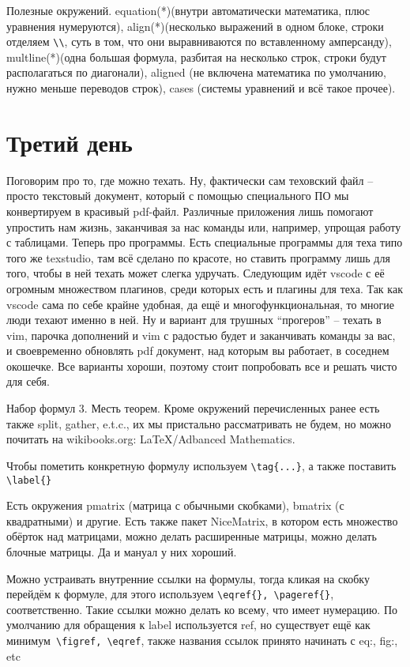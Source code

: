 \documentclass[a4paper, 12pt]{article}
\begin{document}
Полезные окружений. equation(*)(внутри автоматически математика, плюс уравнения нумеруются), align(*)(несколько выражений в одном блоке, строки отделяем \verb|\\|, суть в том, что они выравниваются по вставленному амперсанду), multline(*)(одна большая формула, разбитая на несколько строк, строки будут располагаться по диагонали), aligned (не включена математика по умолчанию, нужно меньше переводов строк), cases (системы уравнений и всё такое прочее). 

\section{Третий день}

Поговорим про то, где можно техать. Ну, фактически сам теховский файл – просто текстовый документ, который с помощью специального ПО мы конвертируем в красивый pdf-файл. Различные приложения лишь помогают упростить нам жизнь, заканчивая за нас команды или, например, упрощая работу с таблицами. Теперь про программы. Есть специальные программы для теха типо того же texstudio, там всё сделано по красоте, но ставить программу лишь для того, чтобы в ней техать может слегка удручать. Следующим идёт vscode с её огромным множеством плагинов, среди которых есть и плагины для теха. Так как vscode сама по себе крайне удобная, да ещё и многофункциональная, то многие люди техают именно в ней. Ну и вариант для трушных “прогеров” – техать в vim, парочка дополнений и vim с радостью будет и заканчивать команды за вас, и своевременно обновлять pdf документ, над которым вы работает, в соседнем окошечке. Все варианты хороши, поэтому стоит попробовать все и решать чисто для себя.

Набор формул 3. Месть теорем. Кроме окружений перечисленных ранее есть также split, gather, e.t.c., их мы пристально рассматривать не будем, но можно почитать на wikibooks.org: LaTeX/Adbanced Mathematics.

Чтобы пометить конкретную формулу используем \verb|\tag{...}|, а также поставить \verb|\label{}|

Есть окружения pmatrix (матрица с обычными скобками), bmatrix (с квадратными) и другие. Есть также пакет NiceMatrix, в котором есть множество обёрток над матрицами, можно делать расширенные матрицы, можно делать блочные матрицы. Да и мануал у них хороший.

Можно устраивать внутренние ссылки на формулы, тогда кликая на скобку перейдём к формуле, для этого используем \verb|\eqref{}, \pageref{}|, соответственно. Такие ссылки можно делать ко всему, что имеет нумерацию. По умолчанию для обращения к label используется ref, но существует ещё как минимум\verb| \figref, \eqref|, также названия ссылок принято начинать с eq:, fig:, etc
\end{document}
